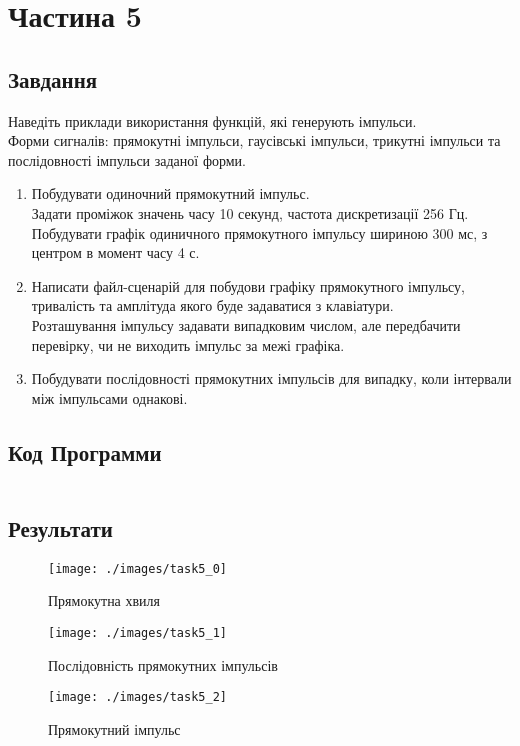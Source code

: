 \section{Частина 5}
\label{sec:task5}

\subsection{Завдання}
\label{subsec:task5_task}

Наведіть приклади використання функцій, які генерують імпульси. \\
Форми сигналів: прямокутні імпульси, гаусівські імпульси, трикутні імпульси
та послідовності імпульси заданої форми.

\begin{enumerate}
    \item
          Побудувати одиночний прямокутний імпульс. \\
          Задати проміжок значень часу 10 секунд, частота дискретизації 256 Гц. \\
          Побудувати графік одиничного прямокутного імпульсу шириною 300 мс,
          з центром в момент часу 4 с.

    \item
          Написати файл-сценарій для побудови графіку прямокутного імпульсу,
          тривалість та амплітуда якого буде задаватися з клавіатури. \\
          Розташування імпульсу задавати випадковим числом,
          але передбачити перевірку, чи не виходить імпульс за межі графіка.

    \item
          Побудувати послідовності прямокутних імпульсів для випадку,
          коли інтервали між імпульсами однакові.
\end{enumerate}

\subsection{Код Программи}
\label{subsec:task5_code}
\inputminted{python}{../src/task5.py}

\subsection{Результати}
\label{subsec:task5_results}

\begin{figure}[!ht]
    \centering
    \texttt{[image: ./images/task5\_0]}
    \caption{Прямокутна хвиля}
    \label{fig:square_wave_infinite}
\end{figure}

\begin{figure}[!ht]
    \centering
    \texttt{[image: ./images/task5\_1]}
    \caption{Послідовність прямокутних імпульсів}
    \label{fig:square_wave_buffer}
\end{figure}

\begin{figure}[!ht]
    \centering
    \texttt{[image: ./images/task5\_2]}
    \caption{Прямокутний імпульс}
    \label{fig:square_pulse}
\end{figure}

